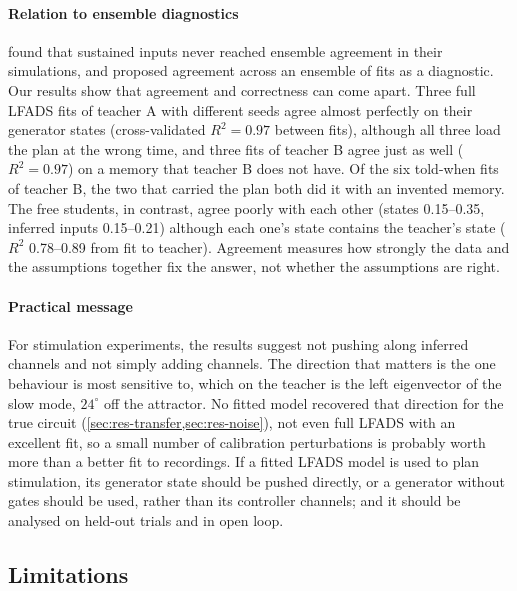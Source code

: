 \documentclass[11pt,a4paper]{article}
\begin{document}
\paragraph{Relation to ensemble diagnostics} \citet{malonis2026} found that sustained inputs never reached ensemble agreement in their simulations, and proposed agreement across an ensemble of fits as a diagnostic. Our results show that agreement and correctness can come apart. Three full LFADS fits of teacher A with different seeds agree almost perfectly on their generator states (cross-validated $R^2=0.97$ between fits), although all three load the plan at the wrong time, and three fits of teacher B agree just as well ($R^2=0.97$) on a memory that teacher B does not have. Of the six told-when fits of teacher B, the two that carried the plan both did it with an invented memory. The free students, in contrast, agree poorly with each other (states 0.15--0.35, inferred inputs 0.15--0.21) although each one's state contains the teacher's state ($R^2$ 0.78--0.89 from fit to teacher). Agreement measures how strongly the data and the assumptions together fix the answer, not whether the assumptions are right.

\paragraph{Practical message} For stimulation experiments, the results suggest not pushing along inferred channels and not simply adding channels. The direction that matters is the one behaviour is most sensitive to, which on the teacher is the left eigenvector of the slow mode, $24^\circ$ off the attractor. No fitted model recovered that direction for the true circuit (\cref{sec:res-transfer,sec:res-noise}), not even full LFADS with an excellent fit, so a small number of calibration perturbations is probably worth more than a better fit to recordings. If a fitted LFADS model is used to plan stimulation, its generator state should be pushed directly, or a generator without gates should be used, rather than its controller channels; and it should be analysed on held-out trials and in open loop.

\subsection{Limitations}\label{sec:limitations}
\end{document}
